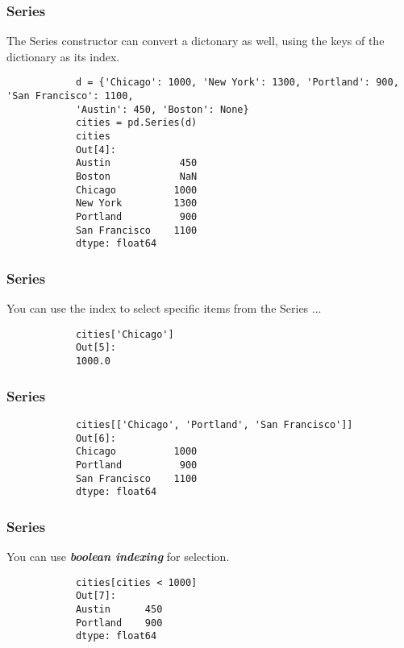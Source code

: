 \documentclass[MASTER.tex]{subfiles}
\begin{document}
	\begin{frame}[fragile]
\frametitle{Series}		
		The Series constructor can convert a dictonary as well, using the keys of the dictionary as its index.
		
		\begin{framed}
			\begin{verbatim}
			d = {'Chicago': 1000, 'New York': 1300, 'Portland': 900, 'San Francisco': 1100,
			'Austin': 450, 'Boston': None}
			cities = pd.Series(d)
			cities
			Out[4]:
			Austin            450
			Boston            NaN
			Chicago          1000
			New York         1300
			Portland          900
			San Francisco    1100
			dtype: float64
			\end{verbatim}
		\end{framed}
	\end{frame}
	\begin{frame}[fragile]
\frametitle{Series}		
		You can use the index to select specific items from the Series ...
		
		\begin{framed}
			\begin{verbatim}
			cities['Chicago']
			Out[5]:
			1000.0
			\end{verbatim}
		\end{framed}
	\end{frame}
	\begin{frame}[fragile]
\frametitle{Series}		
		\begin{framed}
			\begin{verbatim}
			cities[['Chicago', 'Portland', 'San Francisco']]
			Out[6]:
			Chicago          1000
			Portland          900
			San Francisco    1100
			dtype: float64
			\end{verbatim}
		\end{framed}
	\end{frame}
	\begin{frame}[fragile]
\frametitle{Series}		
	You can use \textbf{\textit{boolean indexing}} for selection.
		
		\begin{framed}
			\begin{verbatim}
			cities[cities < 1000]
			Out[7]:
			Austin      450
			Portland    900
			dtype: float64
			\end{verbatim}
		\end{framed}
	\end{frame}
\end{document}
